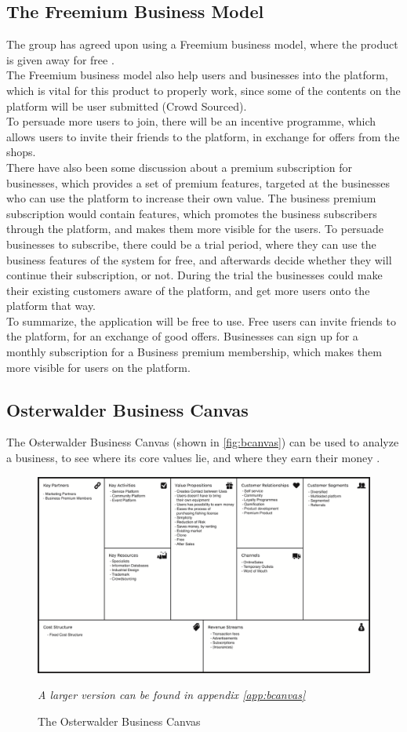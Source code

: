\subsection{The Freemium Business Model}
The group has agreed upon using a Freemium business model, where the product is given away for free \cite{kumar, torres}.\\

The Freemium business model also help users and businesses into the platform, which is vital for this product to properly work, since some of the contents on the platform will be user submitted (Crowd Sourced).\\

To persuade more users to join, there will be an incentive programme, which allows users to invite their friends to the platform, in exchange for offers from the shops.\\


There have also been some discussion about a premium subscription for businesses, which provides a set of premium features, targeted at the businesses who can use the platform to increase their own value.
The business premium subscription would contain features, which promotes the business subscribers through the platform, and makes them more visible for the users.
To persuade businesses to subscribe, there could be a trial period, where they can use the business features of the system for free, and afterwards decide whether they will continue their subscription, or not.
During the trial the businesses could make their existing customers aware of the platform, and get more users onto the platform that way.\\


To summarize, the application will be free to use. 
Free users can invite friends to the platform, for an exchange of good offers.
Businesses can sign up for a monthly subscription for a Business premium membership, which makes them more visible for users on the platform.

\subsection{Osterwalder Business Canvas}
The Osterwalder Business Canvas (shown in \autoref{fig:bcanvas}) can be used to analyze a business, to see where its core values lie, and where they earn their money \cite{bcanvas}.


\begin{figure}[H]
  \centering
  \includegraphics[width=.45\textwidth]{images/business_canvas.png}
  \caption{The Osterwalder Business Canvas}
  \label{fig:bcanvas}
  \footnotesize{\textit{A larger version can be found in appendix \ref{app:bcanvas}}}
\end{figure}


